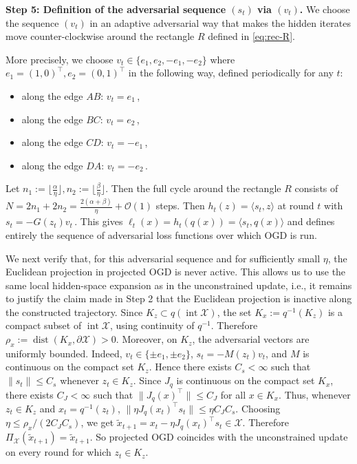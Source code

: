 \documentclass[a4paper,11pt,fullpage]{article}
\theoremstyle{plain}
\theoremstyle{definition}
\theoremstyle{plain}
\begin{document}
\noindent\textbf{Step 5: Definition of the adversarial sequence $(s_t)$ via $(v_t)$.} We choose the sequence $(v_t)$ in an adaptive adversarial way that makes the hidden iterates move counter-clockwise around the rectangle $R$ defined in \eqref{eq:rec-R}. 

More precisely, we choose $v_t \in \{e_1, e_2, -e_1, -e_2 \}$ where $e_1 = (1,0)^{\top}, e_2 = (0,1)^{\top}$ in the following way, defined periodically for any $t$:
\begin{itemize}
\item along the edge $AB$: $v_t = e_1$\,,
\item along the edge $BC$: $v_t = e_2$\,, 
\item along the edge $CD$: $v_t = -e_1$\,, 
\item along the edge $DA$: $v_t = -e_2$\,. 
\end{itemize}

Let $n_1 := \lfloor \frac{\alpha}{\eta}\rfloor, n_2 :=  \lfloor \frac{\beta}{\eta}\rfloor$. Then the full cycle around the rectangle $R$ consists of $N = 2 n_1 + 2 n_2 = \frac{2(\alpha + \beta)}{\eta} + \mathcal{O}(1)$ steps. Then $h_t(z) = \langle s_t, z \rangle$ at round $t$ with $s_t = - G(z_t) v_t\,.$ This gives $\ell_t(x) =h_t(q(x)) = \langle s_t, q(x)\rangle$ and defines entirely the sequence of adversarial loss functions over which OGD is run. 

We next verify that, for this adversarial sequence and for sufficiently small $\eta$, the Euclidean projection in projected OGD is never active. This allows us to use the same local hidden-space expansion as in the unconstrained update, i.e., it remains to justify the claim made in Step 2 that the Euclidean projection is inactive along the constructed trajectory. Since
$K_z\subset q(\operatorname{int}\mathcal X)$,
the set $K_x:=q^{-1}(K_z)$ is a compact subset of $\operatorname{int}\mathcal X$, using continuity of $q^{-1}$. Therefore
$\rho_x:=\operatorname{dist}(K_x,\partial\mathcal X)>0.$
Moreover, on $K_z$, the adversarial vectors are uniformly bounded. Indeed,
\(v_t\in\{\pm e_1,\pm e_2\}\), \(s_t=-M(z_t)v_t\), and \(M\) is continuous on the compact set
$K_z$. Hence there exists $C_s<\infty$ such that
$\|s_t\|\le C_s$ whenever $z_t\in K_z$.
Since $J_q$ is continuous on the compact set $K_x$, there exists $C_J<\infty$ such that $\|J_q(x)^\top\|\le C_J$
for all $x\in K_x$. 
Thus, whenever $z_t\in K_z$ and $x_t=q^{-1}(z_t)$,
$
\|\eta J_q(x_t)^\top s_t\|
\le
\eta C_JC_s.
$
Choosing $\eta\le \rho_x/(2C_JC_s)$, we get
$\widetilde x_{t+1}=x_t-\eta J_q(x_t)^\top s_t\in \mathcal X.$
Therefore $\Pi_{\mathcal X}(\widetilde x_{t+1})=\widetilde x_{t+1}.$
So projected OGD coincides with the unconstrained update on every round for which $z_t\in K_z$.\\ 
\end{document}
